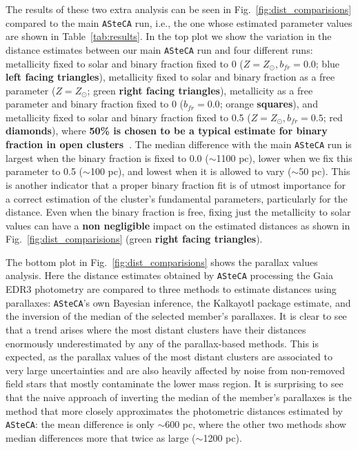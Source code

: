 \documentclass[referee]{aa}
\begin{document}
  The results of these two extra analysis can be seen in
  Fig.~\ref{fig:dist_comparisions} compared to the main \texttt{ASteCA} run,
  i.e., the one whose estimated parameter values are shown in
  Table~\ref{tab:results}.
  In the top plot we show the variation in the distance estimates between our
  main \texttt{ASteCA} run and four different runs: metallicity fixed to solar
  and binary fraction fixed to 0 ($Z=Z_{\odot},b_{fr}=0.0$; blue \textbf{left
  facing triangles}), metallicity fixed to solar and binary fraction as a free
  parameter ($Z=Z_{\odot}$; green \textbf{right facing triangles}), metallicity
  as a free parameter and binary fraction fixed to 0 ($b_{fr}=0.0$; orange
  \textbf{squares}), and metallicity fixed to solar and binary fraction fixed to
  0.5 ($Z=Z_{\odot},b_{fr}=0.5$; red \textbf{diamonds}), where \textbf{50\% is
  chosen to be a typical estimate for binary fraction in open
  clusters~\citep{vonHippel_2005}}.
  The median difference with the main \texttt{ASteCA} run is largest when the
  binary fraction is fixed to 0.0 ($\sim$1100 pc), lower when we fix this
  parameter to 0.5 ($\sim$100 pc), and lowest when it is allowed to vary 
  ($\sim$50 pc). This is another indicator that a proper binary fraction fit is
  of utmost importance for a correct  estimation of the cluster's fundamental
  parameters, particularly for the distance. Even when the binary fraction is
  free, fixing just the metallicity to solar values can have a \textbf{non
  negligible} impact on the estimated distances as shown in
  Fig.~\ref{fig:dist_comparisions} (green \textbf{right facing triangles}).

  The bottom plot in Fig.~\ref{fig:dist_comparisions} shows the parallax values
  analysis. Here the distance estimates obtained by \texttt{ASteCA} processing
  the Gaia EDR3 photometry are compared to three methods to estimate distances
  using parallaxes: \texttt{ASteCA}'s own Bayesian inference, the Kalkayotl
  package estimate, and the inversion of the median of the selected member's
  parallaxes. It is clear to see that a trend arises where the most distant
  clusters have their distances enormously underestimated by any of the
  parallax-based methods. This is expected, as the parallax values of the most
  distant clusters are associated to very large uncertainties and are also
  heavily affected by noise from non-removed field stars that mostly contaminate
  the lower mass region.
  It is surprising to see that the naive approach of inverting the median of
  the member's parallaxes is the method that more closely approximates the
  photometric distances estimated by \texttt{ASteCA}: the mean difference is
  only $\sim$600 pc, where the other two methods show median differences more
  that twice as large ($\sim$1200 pc).
  \\
\end{document}

